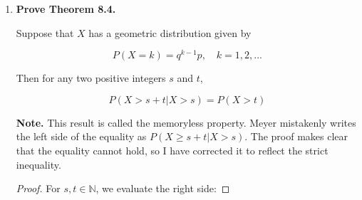 \documentclass[10pt, oneside]{article}
\begin{document}
\begin{enumerate}[label=8.\arabic*]
\begin{enumerate}
	\[ P(\text{all 3 kinds among chosen}) = \sum^8_{j=1} \sum^{9-j}_{i=1} \frac{10!}{(10-i-j)! i! j!} P(X_1)^j P(X_2)^i P(X_3)^{10-i-j} \approx \boxed{ 0.864} \] 
	
	To further solidify the thoughts undergirding the above expression, I encourage the reader to write out each term of the double summation to see that, indeed, every possible triple sum of integers $1,...,8$ adding to 10 is covered.
	
	\item  \begin{tcolorbox}[
	  colback=Cerulean!5!white,
	  colframe=Cerulean!75!black]
	\textbf{What is the probability that there are three of one kind, three of another kind, and four of the third kind in a sample of 10?}
	\end{tcolorbox}
	
	We can have either 4 of the first, second, or third kind of washer and 3 for the remaining two. Thus we have
	
	\begin{align*}
	P(\text{3 one kind, 3 second kind, 4 third kind}) &= \frac{10!}{4! 3! 3!} (P(X_1)^4 P(X_2)^3 P(X_3)^3 + P(X_1)^3 P(X_2)^4 P(X_3)^3 \\
	&\quad + P(X_1)^3 P(X_2)^3 P(X_3)^4 ) \\
	&\approx \boxed{0.1134}
	\end{align*}
	\end{enumerate}

\item  \begin{tcolorbox}[
  colback=Cerulean!5!white,
  colframe=Cerulean!75!black]
\textbf{Prove Theorem 8.4.}
\end{tcolorbox}

\begin{thm*}
Suppose that $X$ has a geometric distribution given by

\[ P(X = k) = q^{k-1} p, \quad k = 1, 2, ... \]

Then for any two positive integers $s$ and $t$,

\[ P(X > s + t | X > s) = P(X > t) \]
\end{thm*}

\textbf{Note.} This result is called the memoryless property. Meyer mistakenly writes the left side of the equality as $P(X \geq s+t | X > s)$. The proof makes clear that the equality cannot hold, so I have corrected it to reflect the strict inequality.

\begin{proof}
For $s, t \in \mathbb{N}$, we evaluate the right side:


\end{proof}
\end{enumerate}
\end{document}
